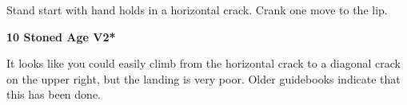 \begin{multicols}{2}
					\begin{adjustwidth}{0.5cm}{}				
					Stand start with hand holds in a horizontal crack. Crank one move to the lip.
					\end{adjustwidth}
					\label{rt:Stoned Age}
\colorbox{green!20}{
\parbox{0.95\linewidth}{
\textbf{
10 Stoned Age V2*  
}
}
}

					\begin{adjustwidth}{0.5cm}{}				
					It looks like you could easily climb from the horizontal crack to a diagonal crack on the upper right, but the landing is very poor. Older guidebooks indicate that this has been done.
					\end{adjustwidth}
\end{multicols}
\clearpage
